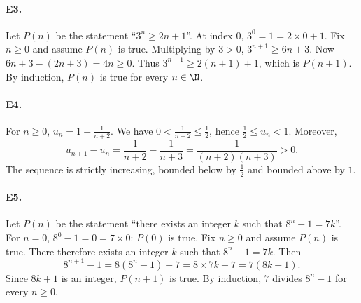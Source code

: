 \paragraph{E3.}Let $P(n)$ be the statement ``$3^n\ge2n+1$''. At index $0$, $3^0=1=2\times0+1$.
Fix $n\ge0$ and assume $P(n)$ is true. Multiplying by $3>0$, $3^{n+1}\ge6n+3$. Now $6n+3-(2n+3)=4n\ge0$. Thus $3^{n+1}\ge2(n+1)+1$, which is $P(n+1)$. By induction, $P(n)$ is true for every $n\in\N$.

\paragraph{E4.}For $n\ge0$, $u_n=1-\frac{1}{n+2}$. We have $0<\frac{1}{n+2}\le\frac{1}{2}$, hence $\frac{1}{2}\le u_n<1$. Moreover,
\[u_{n+1}-u_n=\frac1{n+2}-\frac1{n+3}=\frac1{(n+2)(n+3)}>0.\]
The sequence is strictly increasing, bounded below by $\frac{1}{2}$ and bounded above by $1$.

\paragraph{E5.}Let $P(n)$ be the statement ``there exists an integer $k$ such that $8^n-1=7k$''. For $n=0$, $8^0-1=0=7\times0$: $P(0)$ is true.
Fix $n\ge0$ and assume $P(n)$ is true. There therefore exists an integer $k$ such that $8^n-1=7k$. Then
\[8^{n+1}-1=8(8^n-1)+7=8\times7k+7=7(8k+1).\]
Since $8k+1$ is an integer, $P(n+1)$ is true. By induction, $7$ divides $8^n-1$ for every $n\ge0$.

